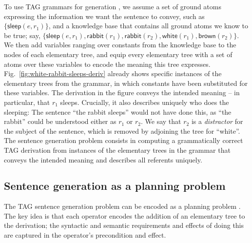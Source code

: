 To use TAG grammars for generation \cite{Stone2003a}, we assume a set
of ground atoms expressing the information we want the sentence to
convey, such as $\{\mathsf{sleep}(e,r_1)\}$, and a knowledge base that
contains all ground atoms we know to be true; say,
$\{\mathsf{sleep}(e,r_1), \mathsf{rabbit}(r_1), \mathsf{rabbit}(r_2),
\mathsf{white}(r_1), \mathsf{brown}(r_2)\}$.  We then add variables
ranging over constants from the knowledge base to the nodes of each
elementary tree, and equip every elementary tree with a set of atoms
over these variables to encode the meaning this tree expresses.
Fig.~\ref{fig:white-rabbit-sleeps-deriv} already shows specific
instances of the elementary trees from the grammar, in which constants
have been substituted for these variables.  The derivation in the
figure conveys the intended meaning -- in particular, that $r_1$
sleeps.  Crucially, it also describes uniquely who does the sleeping:
The sentence ``the rabbit sleeps'' would not have done this, as ``the
rabbit'' could be understood either as $r_1$ or $r_2$.  We say that
$r_2$ is a \emph{distractor} for the subject of the sentence, which is
removed by adjoining the tree for ``white''.  The sentence generation
problem consists in computing a grammatically correct TAG derivation
from instances of the elementary trees in the grammar that conveys the
intended meaning and describes all referents uniquely.




\subsection{Sentence generation as a planning problem}

The TAG sentence generation problem can be encoded as a planning
problem \cite{KolSto07}.  The key idea is that each operator encodes
the addition of an elementary tree to the derivation; the syntactic
and semantic requirements and effects of doing this are captured in
the operator's precondition and effect.


\newcommand{\action}[4]{\textbf{#1$(#2)$:}\\
\strut\quad   Precond:$\;$ \parbox[t]{12cm}{\ensuremath{#3}}\\
\strut\quad   Effect:$\;$ \parbox[t]{12cm}{\ensuremath{#4}}}
\newcommand{\f}[1]{\mathsf{#1}}


